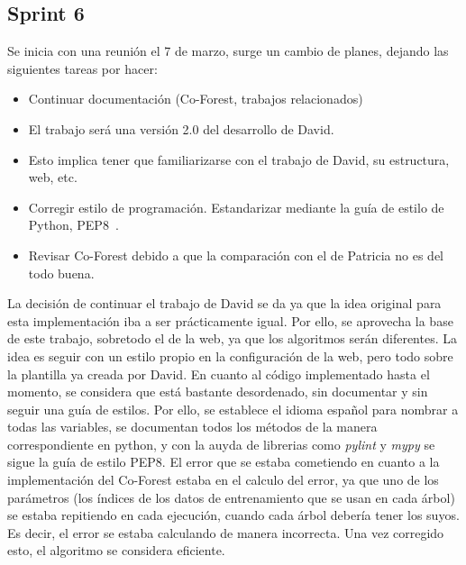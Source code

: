 \subsection{Sprint 6}
Se inicia con una reunión el 7 de marzo, surge un cambio de planes, dejando las siguientes tareas por hacer:
\begin{itemize}
	\item Continuar documentación (Co-Forest, trabajos relacionados)
	\item El trabajo será una versión 2.0 del desarrollo de David.
	\item Esto implica tener que familiarizarse con el trabajo de David, su estructura, web, etc.
	\item Corregir estilo de programación. Estandarizar mediante la guía de estilo de Python, PEP8~\cite{PEP8}.
	\item Revisar Co-Forest debido a que la comparación con el de Patricia no es del todo buena.
	
\end{itemize} 
La decisión de continuar el trabajo de David se da ya que la idea original para esta implementación iba a ser prácticamente igual. Por ello, se aprovecha la base de este trabajo, sobretodo el de la web, ya que los algoritmos serán diferentes. La idea es seguir con un estilo propio en la configuración de la web, pero todo sobre la plantilla ya creada por David. 
En cuanto al código implementado hasta el momento, se considera que está bastante desordenado, sin documentar y sin seguir una guía de estilos. Por ello, se establece el idioma español para nombrar a todas las variables, se documentan todos los métodos de la manera correspondiente en python, y con la auyda de librerias como \textit{pylint} y \textit{mypy} se sigue la guía de estilo PEP8.
El error que se estaba cometiendo en cuanto a la implementación del Co-Forest estaba en el calculo del error, ya que uno de los parámetros (los índices de los datos de entrenamiento que se usan en cada árbol) se estaba repitiendo en cada ejecución, cuando cada árbol debería tener los suyos. Es decir, el error se estaba calculando de manera incorrecta. Una vez corregido esto, el algoritmo se considera eficiente.

